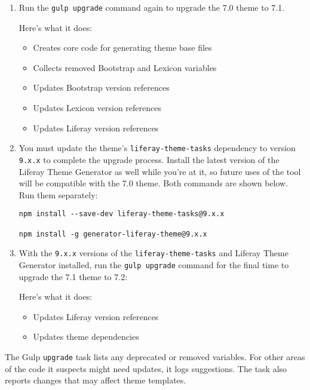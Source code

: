 \begin{enumerate}
\def\labelenumi{\arabic{enumi}.}
\setcounter{enumi}{2}
\item
  Run the \texttt{gulp\ upgrade} command again to upgrade the 7.0 theme
  to 7.1.

  Here's what it does:

  \begin{itemize}
  \tightlist
  \item
    Creates core code for generating theme base files
  \item
    Collects removed Bootstrap and Lexicon variables
  \item
    Updates Bootstrap version references
  \item
    Updates Lexicon version references
  \item
    Updates Liferay version references
  \end{itemize}
\item
  You must update the theme's \texttt{liferay-theme-tasks} dependency to
  version \texttt{9.x.x} to complete the upgrade process. Install the
  latest version of the Liferay Theme Generator as well while you're at
  it, so future uses of the tool will be compatible with the 7.0 theme.
  Both commands are shown below. Run them separately:

\begin{verbatim}
npm install --save-dev liferay-theme-tasks@9.x.x

npm install -g generator-liferay-theme@9.x.x
\end{verbatim}
\item
  With the \texttt{9.x.x} versions of the \texttt{liferay-theme-tasks}
  and Liferay Theme Generator installed, run the \texttt{gulp\ upgrade}
  command for the final time to upgrade the 7.1 theme to 7.2:

  Here's what it does:

  \begin{itemize}
  \tightlist
  \item
    Updates Liferay version references
  \item
    Updates theme dependencies
  \end{itemize}
\end{enumerate}

The Gulp \texttt{upgrade} task lists any deprecated or removed
variables. For other areas of the code it suspects might need updates,
it logs suggestions. The task also reports changes that may affect theme
templates.

